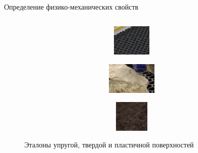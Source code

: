 \documentclass[aspectratio=169,xcolor=table,10pt]{beamer}
\begin{document}
\begin{frame}[t]{Определение физико-механических свойств}
\begin{columns}[T,onlytextwidth]
\begin{column}{0.54\textwidth}
\begin{figure}[H]
            \begin{subfigure}[b]{0.3\textwidth}
                \centering\includegraphics[height=1.5cm,width=1\textwidth,keepaspectratio]{surface_types/rubber.JPG}
            \end{subfigure}
            \hfill
            \begin{subfigure}[b]{0.3\textwidth}
                \centering\includegraphics[height=1.5cm,width=1\textwidth,keepaspectratio]{surface_types/rock.jpg}
            \end{subfigure}
            \hfill
            \begin{subfigure}[b]{0.3\textwidth}
                \centering\includegraphics[height=1.5cm,width=1\textwidth,keepaspectratio]{surface_types/zemlya.jpg}\\
            \end{subfigure}
            \vspace{-0.3cm}
            \caption{Эталоны упругой, твердой и пластичной поверхностей}
        \end{figure}
    \end{column}
\end{columns}
\end{frame}
\end{document}
